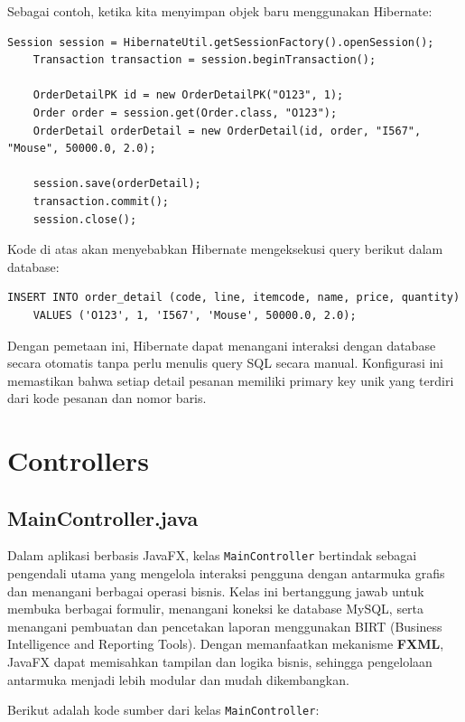 Sebagai contoh, ketika kita menyimpan objek baru menggunakan Hibernate:

\begin{lstlisting}[style=JavaStyle]
	Session session = HibernateUtil.getSessionFactory().openSession();
	Transaction transaction = session.beginTransaction();
	
	OrderDetailPK id = new OrderDetailPK("O123", 1);
	Order order = session.get(Order.class, "O123");
	OrderDetail orderDetail = new OrderDetail(id, order, "I567", "Mouse", 50000.0, 2.0);
	
	session.save(orderDetail);
	transaction.commit();
	session.close();
\end{lstlisting}

Kode di atas akan menyebabkan Hibernate mengeksekusi query berikut dalam database:

\begin{lstlisting}[style=sql]
	INSERT INTO order_detail (code, line, itemcode, name, price, quantity) 
	VALUES ('O123', 1, 'I567', 'Mouse', 50000.0, 2.0);
\end{lstlisting}

Dengan pemetaan ini, Hibernate dapat menangani interaksi dengan database secara otomatis tanpa perlu menulis query SQL secara manual. Konfigurasi ini memastikan bahwa setiap detail pesanan memiliki primary key unik yang terdiri dari kode pesanan dan nomor baris.

\section{Controllers}

\subsection{MainController.java}

Dalam aplikasi berbasis JavaFX, kelas \texttt{MainController} bertindak sebagai pengendali utama yang mengelola interaksi pengguna dengan antarmuka grafis dan menangani berbagai operasi bisnis. Kelas ini bertanggung jawab untuk membuka berbagai formulir, menangani koneksi ke database MySQL, serta menangani pembuatan dan pencetakan laporan menggunakan BIRT (Business Intelligence and Reporting Tools). Dengan memanfaatkan mekanisme \textbf{FXML}, JavaFX dapat memisahkan tampilan dan logika bisnis, sehingga pengelolaan antarmuka menjadi lebih modular dan mudah dikembangkan.

Berikut adalah kode sumber dari kelas \texttt{MainController}:

